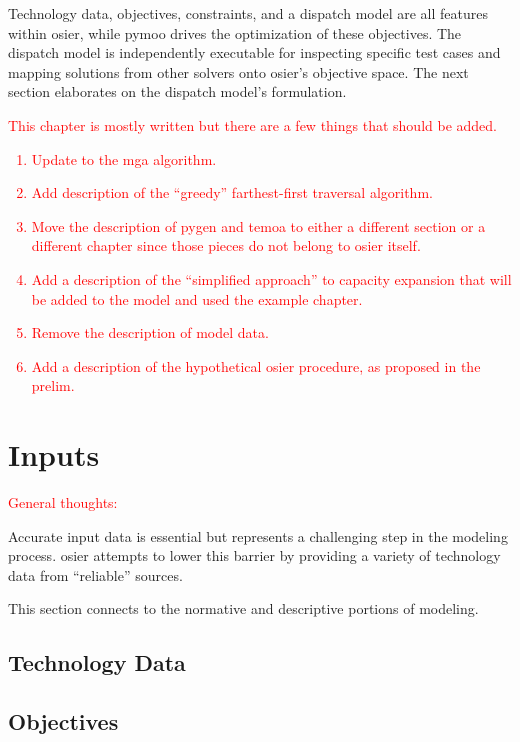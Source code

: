 Technology data, objectives, constraints, and a dispatch model are all features
within \ac{osier}, while \ac{pymoo} drives the optimization of these objectives.
The dispatch model is independently executable for inspecting specific test
cases and mapping solutions from other solvers onto \ac{osier}'s objective
space. The next section elaborates on the dispatch model's formulation.

\textcolor{red}{This chapter is mostly written but there are a few things that
should be added.}

\textcolor{red}{\begin{enumerate}
    \item Update to the \ac{mga} algorithm.
    \item Add description of the ``greedy'' farthest-first traversal algorithm.
    \item Move the description of \ac{pygen} and \ac{temoa} to either a
    different section or a different chapter since those pieces do not belong to
    \ac{osier} itself.
    \item Add a description of the ``simplified approach'' to capacity expansion
    that will be added to the model and used the example chapter.
    \item Remove the description of model data.
    \item Add a description of the hypothetical \ac{osier} procedure, as
    proposed in the prelim.
\end{enumerate}}

\section{Inputs}

\textcolor{red}{General thoughts:}

Accurate input data is essential but represents a challenging step in the
modeling process. \ac{osier} attempts to lower this barrier by providing a
variety of technology data from ``reliable'' sources.

This section connects to the normative and descriptive portions of modeling. 

\subsection{Technology Data}

\subsection{Objectives}

